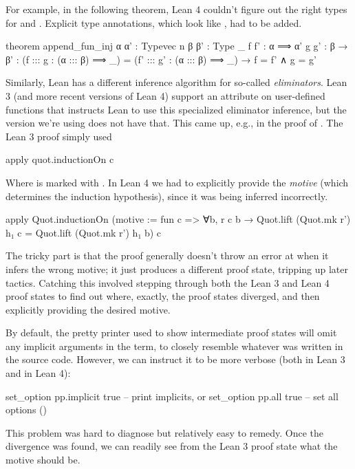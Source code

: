 For example, in the following theorem, Lean 4 couldn't figure out the right types for  and 
. Explicit type annotations, which look like , had to be added.
\begin{leancode}
  theorem append_fun_inj {α α' : Typevec n} {β β' : Type _} 
                         {f f' : α ⟹ α'} {g g' : β → β'} :
    (f ::: g : (α ::: β) ⟹ _) = (f' ::: g' : (α ::: β) ⟹ _) 
      → f = f' ∧ g = g'
\end{leancode}


Similarly, Lean has a different inference algorithm for so-called \emph{eliminators}.
Lean 3 (and more recent versions of Lean 4) support an  attribute on user-defined
functions that instructs Lean to use this specialized eliminator inference, but the version we're using
does not have that.
This came up, e.g., in the proof of . The Lean 3 proof simply used
\begin{leancode}    
  apply quot.inductionOn c
\end{leancode}  
Where  is marked with .
In Lean 4 we had to explicitly provide the \emph{motive} (which determines the induction hypothesis), 
since it was being inferred incorrectly.
\begin{leancode}
  apply Quot.inductionOn (motive := fun c => ∀b, r c b → 
        Quot.lift (Quot.mk r') h₁ c = Quot.lift (Quot.mk r') h₁ b) c
\end{leancode}

The tricky part is that the proof generally doesn't throw an error at  when it
infers the wrong motive; it just produces a different proof state, tripping up later tactics.
Catching this involved stepping through both the Lean 3 and Lean 4 proof states to find out where, exactly, the proof states diverged, 
and then explicitly providing the desired motive.

By default, the pretty printer used to show intermediate proof states will
omit any implicit arguments in the term, to closely resemble whatever was written in the source code.
However, we can instruct it to be more verbose (both in Lean 3 and in Lean 4):
\begin{leancode}
  set_option pp.implicit true -- print implicits, or
  set_option pp.all true      -- set all options ()
\end{leancode}

This problem was hard to diagnose but relatively easy to remedy.
Once the divergence was found, we can readily see from the Lean 3 proof state what the motive should be.


